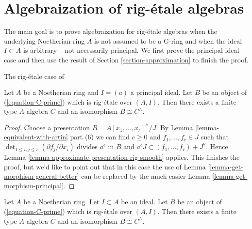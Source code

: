 \section{Algebraization of rig-\'etale algebras}
\label{section-approximation-principal}

\noindent
The main goal is to prove algebraization for rig-\'etale algebras
when the underlying Noetherian ring $A$ is not assumed to be a G-ring
and when the ideal $I \subset A$ is arbitrary -- not necessarily principal.
We first prove the principal ideal case and then use the result
of Section \ref{section-approximation} to finish the proof.

\begin{lemma}
\label{lemma-approximate-principal}
\begin{reference}
The rig-\'etale case of \cite[III Theorem 7]{Elkik}
\end{reference}
Let $A$ be a Noetherian ring and $I = (a)$ a principal ideal.
Let $B$ be an object of (\ref{equation-C-prime}) which is
rig-\'etale over $(A, I)$.
Then there exists a finite type $A$-algebra $C$ and an
isomorphism $B \cong C^\wedge$.
\end{lemma}

\begin{proof}
Choose a presentation $B = A[x_1, \ldots, x_r]^\wedge/J$.
By Lemma \ref{lemma-equivalent-with-artin} part (6) we can find
$c \geq 0$ and $f_1, \ldots, f_r \in J$ such that
$\det_{1 \leq i, j \leq r}(\partial f_j/\partial x_i)$ divides
$a^c$ in $B$ and
$a^c J \subset (f_1, \ldots, f_r) + J^2$.
Hence Lemma \ref{lemma-approximate-presentation-rig-smooth} applies.
This finishes the proof, but we'd like to point out that in
this case the use of
Lemma \ref{lemma-get-morphism-general-better}
can be replaced by the much easier
Lemma \ref{lemma-get-morphism-principal}.
\end{proof}

\begin{lemma}
\label{lemma-approximate}
Let $A$ be a Noetherian ring. Let $I \subset A$ be an ideal.
Let $B$ be an object of (\ref{equation-C-prime}) which is
rig-\'etale over $(A, I)$.
Then there exists a finite type $A$-algebra $C$ and an
isomorphism $B \cong C^\wedge$.
\end{lemma}

